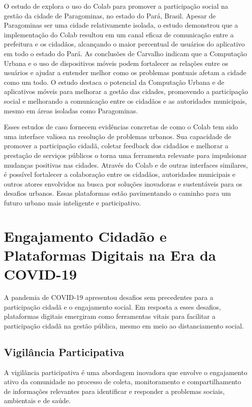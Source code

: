 O estudo de  explora o uso do Colab para promover a participação social na gestão da cidade de Paragominas, no estado do Pará, Brasil. Apesar de Paragominas ser uma cidade relativamente isolada, o estudo demonstrou que a implementação do Colab resultou em um canal eficaz de comunicação entre a prefeitura e os cidadãos, alcançando o maior percentual de usuários do aplicativo em todo o estado do Pará. As conclusões de Carvalho indicam que a Computação Urbana e o uso de dispositivos móveis podem fortalecer as relações entre os usuários e ajudar a entender melhor como os problemas pontuais afetam a cidade como um todo. O estudo destaca o potencial da Computação Urbana e de aplicativos móveis para melhorar a gestão das cidades, promovendo a participação social e melhorando a comunicação entre os cidadãos e as autoridades municipais, mesmo em áreas isoladas como Paragominas.

Esses estudos de caso fornecem evidências concretas de como o Colab tem sido uma interface valiosa na resolução de problemas urbanos. Sua capacidade de promover a participação cidadã, coletar feedback dos cidadãos e melhorar a prestação de serviços públicos o torna uma ferramenta relevante para impulsionar mudanças positivas nas cidades. Através do Colab e de outras interfaces similares, é possível fortalecer a colaboração entre os cidadãos, autoridades municipais e outros atores envolvidos na busca por soluções inovadoras e sustentáveis para os desafios urbanos. Essas plataformas estão pavimentando o caminho para um futuro urbano mais inteligente e participativo.

\section*{Engajamento Cidadão e Plataformas Digitais na Era da COVID-19}
A pandemia de COVID-19 apresentou desafios sem precedentes para a participação cidadã e o engajamento social. Em resposta a esses desafios, plataformas digitais emergiram como ferramentas vitais para facilitar a participação cidadã na gestão pública, mesmo em meio ao distanciamento social.

\subsection*{Vigilância Participativa}
A vigilância participativa é uma abordagem inovadora que envolve o engajamento ativo da comunidade no processo de coleta, monitoramento e compartilhamento de informações relevantes para identificar e responder a problemas sociais, ambientais e de saúde. 

